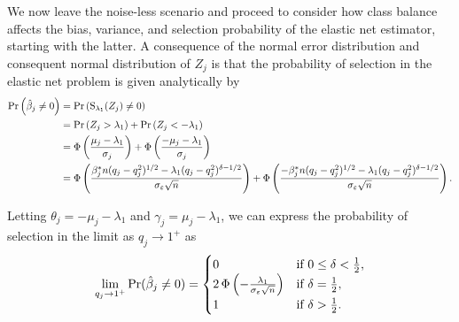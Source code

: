 We now leave the noise-less scenario and proceed to consider how class balance affects the
bias, variance, and selection probability of the elastic net estimator, starting with the
latter. A consequence of the normal error distribution and consequent normal distribution
of \({Z_j}\) is that the probability of selection in the elastic net problem is given
analytically by
\begin{align}
  \label{eq:selection-probability}
  \Pr\left(\hat{\beta}_j \neq 0\right) & = \Pr\left(\operatorname{S}_{\lambda_1}({Z_j}) \neq 0\right)                                                                                                                                                                                                                           \nonumber \\
                                       & = \Pr\left({Z_j} > \lambda_1\right) + \Pr\left({Z_j} < -\lambda_1\right)                                                                                                                                                                                                  \nonumber \\
                                       & = \operatorname{\Phi}\left(\frac{\mu_j - \lambda_1}{\sigma_j}\right) + \operatorname{\Phi}\left(\frac{- \mu_j -\lambda_1}{\sigma_j}\right)                                                                                                                                                              \nonumber \\
                                       & = \operatorname{\Phi} \left( \frac{\beta_j^*n (q_j-q_j^2)^{1/2} - \lambda_1(q_j-q_j^2)^{\delta - 1/2}}{\sigma_\varepsilon \sqrt{n}}\right)                 + \operatorname{\Phi} \left( \frac{-\beta_j^*n (q_j-q_j^2)^{1/2} - \lambda_1(q_j-q_j^2)^{\delta - 1/2}}{\sigma_\varepsilon \sqrt{n}}\right).
\end{align}

Letting \(\theta_j = -\mu_j - \lambda_1 \) and \(\gamma_j = \mu_j - \lambda_1\), we can
express the probability of selection in the limit as \(q_j \rightarrow 1^+\) as
\begin{equation}
  \label{eq:selection-probability-limit}
  \lim_{q_j \rightarrow 1^+} \Pr(\hat{\beta}_j \neq 0) =
  \begin{cases}
    0                                                                & \text{if } 0 \leq \delta < \frac{1}{2}, \\
    2\operatorname{\Phi}\left(-\frac{\lambda_1}{\sigma_\varepsilon \sqrt{n}}\right) & \text{if } \delta = \frac{1}{2},        \\
    1                                                                & \text{if } \delta > \frac{1}{2}.
  \end{cases}
\end{equation}

